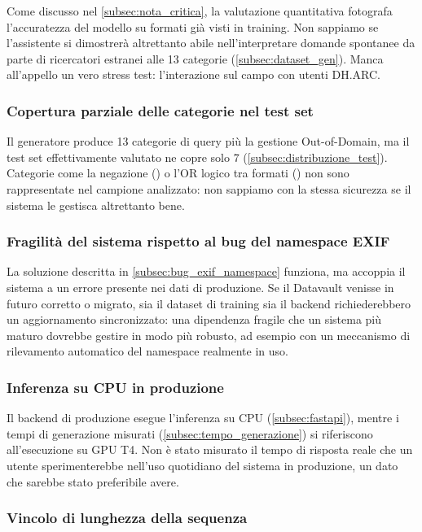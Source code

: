 Come discusso nel \cref{subsec:nota_critica}, la valutazione quantitativa fotografa l'accuratezza del modello su formati già visti in training. Non sappiamo se l'assistente si dimostrerà altrettanto abile nell'interpretare domande spontanee da parte di ricercatori estranei alle 13 categorie (\cref{subsec:dataset_gen}). Manca all'appello un vero stress test: l'interazione sul campo con utenti DH.ARC.\@

\subsubsection{Copertura parziale delle categorie nel test set}

Il generatore produce 13 categorie di query più la gestione Out-of-Domain, ma il test set effettivamente valutato ne copre solo 7 (\cref{subsec:distribuzione_test}). Categorie come la negazione () o l'OR logico tra formati () non sono rappresentate nel campione analizzato: non sappiamo con la stessa sicurezza se il sistema le gestisca altrettanto bene.

\subsubsection{Fragilità del sistema rispetto al bug del namespace EXIF}

La soluzione descritta in \cref{subsec:bug_exif_namespace} funziona, ma accoppia il sistema a un errore presente nei dati di produzione. Se il Datavault venisse in futuro corretto o migrato, sia il dataset di training sia il backend richiederebbero un aggiornamento sincronizzato: una dipendenza fragile che un sistema più maturo dovrebbe gestire in modo più robusto, ad esempio con un meccanismo di rilevamento automatico del namespace realmente in uso.

\subsubsection{Inferenza su CPU in produzione}

Il backend di produzione esegue l'inferenza su CPU (\cref{subsec:fastapi}), mentre i tempi di generazione misurati (\cref{subsec:tempo_generazione}) si riferiscono all'esecuzione su GPU T4. Non è stato misurato il tempo di risposta reale che un utente sperimenterebbe nell'uso quotidiano del sistema in produzione, un dato che sarebbe stato preferibile avere.

\subsubsection{Vincolo di lunghezza della sequenza}

